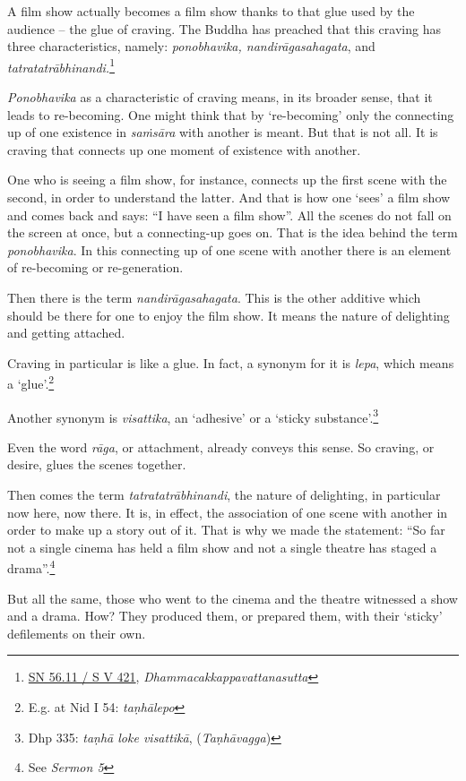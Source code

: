 A film show actually becomes a film show thanks to that glue used by the audience -- the glue of craving. The Buddha has preached that this craving has three characteristics, namely: \emph{ponobhavika, nandirāgasahagata}, and \emph{tatratatrābhinandi.}\footnote{\href{https://suttacentral.net/sn56.11/pli/ms}{SN 56.11 / S V 421}, \emph{Dhammacakkappavattanasutta}}

\emph{Ponobhavika} as a characteristic of craving means, in its broader sense, that it leads to re-becoming. One might think that by `re-becoming' only the connecting up of one existence in \emph{saṁsāra} with another is meant. But that is not all. It is craving that connects up one moment of existence with another.

One who is seeing a film show, for instance, connects up the first scene with the second, in order to understand the latter. And that is how one `sees' a film show and comes back and says: ``I have seen a film show''. All the scenes do not fall on the screen at once, but a connecting-up goes on. That is the idea behind the term \emph{ponobhavika}. In this connecting up of one scene with another there is an element of re-becoming or re-generation.

Then there is the term \emph{nandirāgasahagata}. This is the other additive which should be there for one to enjoy the film show. It means the nature of delighting and getting attached.

Craving in particular is like a glue. In fact, a synonym for it is \emph{lepa}, which means a `glue'.\footnote{E.g. at Nid I 54: \emph{taṇhālepo}}

Another synonym is \emph{visattika}, an `adhesive' or a `sticky substance'.\footnote{Dhp 335: \emph{taṇhā loke visattikā}, (\emph{Taṇhāvagga})}

Even the word \emph{rāga}, or attachment, already conveys this sense. So craving, or desire, glues the scenes together.

Then comes the term \emph{tatratatrābhinandi}, the nature of delighting, in particular now here, now there. It is, in effect, the association of one scene with another in order to make up a story out of it. That is why we made the statement: ``So far not a single cinema has held a film show and not a single theatre has staged a drama''.\footnote{See \emph{Sermon 5}}

But all the same, those who went to the cinema and the theatre witnessed a show and a drama. How? They produced them, or prepared them, with their `sticky' defilements on their own.

